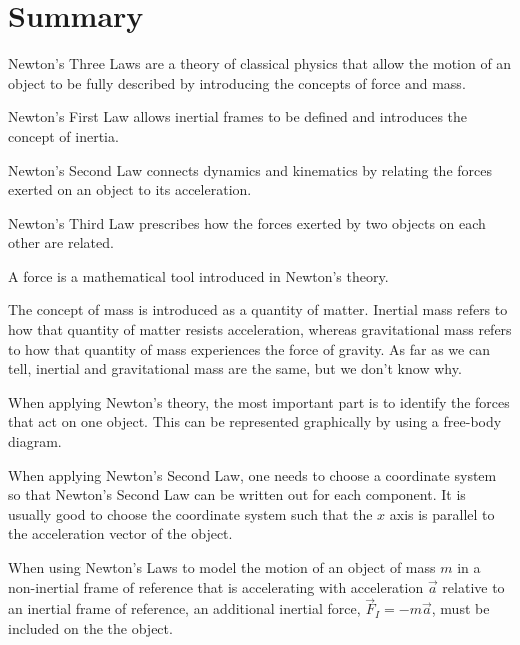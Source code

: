\section{Summary}
\vspace{1cm}
\begin{chapterSummary}
{\item Newton's Three Laws are a theory of classical physics that allow the motion of an object to be fully described by introducing the concepts of force and mass.
\item Newton's First Law allows inertial frames to be defined and introduces the concept of inertia. 
\item Newton's Second Law connects dynamics and kinematics by relating the forces exerted on an object to its acceleration.
\item Newton's Third Law prescribes how the forces exerted by two objects on each other are related.
\item A force is a mathematical tool introduced in Newton's theory.
\item The concept of mass is introduced as a quantity of matter. Inertial mass refers to how that quantity of matter resists acceleration, whereas gravitational mass refers to how that quantity of mass experiences the force of gravity. As far as we can tell, inertial and gravitational mass are the same, but we don't know why. 
\item When applying Newton's theory, the most important part is to identify the forces that act on one object. This can be represented graphically by using a free-body diagram.
\item When applying Newton's Second Law, one needs to choose a coordinate system so that Newton's Second Law can be written out for each component. It is usually good to choose the coordinate system such that the $x$ axis is parallel to the acceleration vector of the object.
\item When using Newton's Laws to model the motion of an object of mass $m$ in a non-inertial frame of reference that is accelerating with acceleration $\vec a$ relative to an inertial frame of reference, an additional inertial force, $\vec F_I=-m\vec a$, must be included on the the object.}
\end{chapterSummary}


